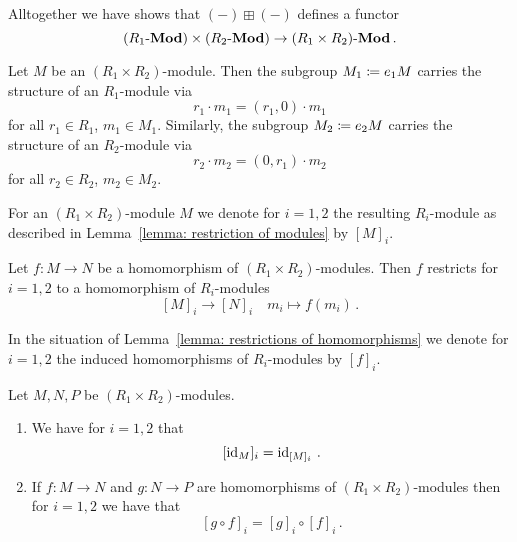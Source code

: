 \begin{remark}
  \label{remark: functor out of product}
  Alltogether we have shows that $(-) \boxplus (-)$ defines a functor
  \[
        (R_1\text{-}\mathbf{Mod}) \times (R_2\text{-}\mathbf{Mod})
    \to (R_1 \times R_2)\text{-}\mathbf{Mod} \,.
  \]
\end{remark}


\begin{lemma}
  \label{lemma: restriction of modules}
  Let $M$ be an $(R_1 \times R_2)$-module.
  Then the subgroup $M_1 \coloneqq e_1 M$ carries the structure of an $R_1$-module via
  \[
      r_1 \cdot m_1
    = (r_1, 0) \cdot m_1
  \]
  for all $r_1 \in R_1$, $m_1 \in M_1$.
  Similarly, the subgroup $M_2 \coloneqq e_2 M$ carries the structure of an $R_2$-module via
  \[
      r_2 \cdot m_2
    = (0, r_1) \cdot m_2
  \]
  for all $r_2 \in R_2$, $m_2 \in M_2$.
\end{lemma}


\begin{definition}
  For an $(R_1 \times R_2)$-module $M$ we denote for $i = 1, 2$ the resulting $R_i$-module as described in Lemma~\ref{lemma: restriction of modules} by $[M]_i$.
\end{definition}


\begin{lemma}
  \label{lemma: restrictions of homomorphisms}
  Let $f \colon M \to N$ be a homomorphism of $(R_1 \times R_2)$-modules.
  Then $f$ restricts for $i = 1, 2$ to a homomorphism of $R_i$-modules
  \[
            [M]_i
    \to     [N]_i
    \quad   m_i
    \mapsto f(m_i) \,.
  \]
\end{lemma}


\begin{definition}
  In the situation of Lemma~\ref{lemma: restrictions of homomorphisms} we denote for $i = 1, 2$ the induced homomorphisms of $R_i$-modules by $[f]_i$.
\end{definition}


\begin{lemma}
  Let $M, N, P$ be $(R_1 \times R_2)$-modules.
  \begin{enumerate}
    \item
      We have for $i = 1, 2$ that
      \[
          [\operatorname{id}_M]_i
        = \operatorname{id}_{[M]_i} \,.
      \]
    \item
      If $f \colon M \to N$ and $g \colon N \to P$ are homomorphisms of $(R_1 \times R_2)$-modules then for $i = 1, 2$ we have that
      \[
          [g \circ f]_i
        = [g]_i \circ [f]_i \,.
      \]
  \end{enumerate}
\end{lemma}


